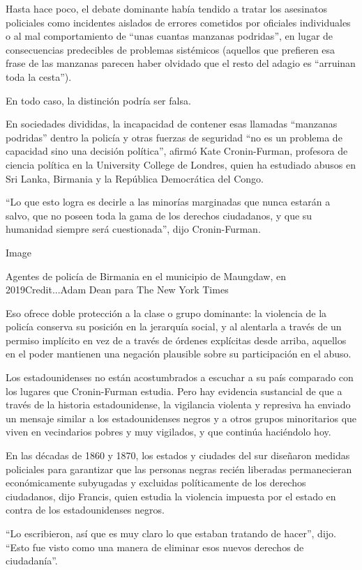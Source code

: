 Hasta hace poco, el debate dominante había tendido a tratar los
asesinatos policiales como incidentes aislados de errores cometidos por
oficiales individuales o al mal comportamiento de ``unas cuantas
manzanas podridas'', en lugar de consecuencias predecibles de problemas
sistémicos (aquellos que prefieren esa frase de las manzanas parecen
haber olvidado que el resto del adagio es ``arruinan toda la cesta'').

En todo caso, la distinción podría ser falsa.

En sociedades divididas, la incapacidad de contener esas llamadas
``manzanas podridas'' dentro la policía y otras fuerzas de seguridad
``no es un problema de capacidad sino una decisión política'', afirmó
Kate Cronin-Furman, profesora de ciencia política en la University
College de Londres, quien ha estudiado abusos en Sri Lanka, Birmania y
la República Democrática del Congo.

``Lo que esto logra es decirle a las minorías marginadas que nunca
estarán a salvo, que no poseen toda la gama de los derechos ciudadanos,
y que su humanidad siempre será cuestionada'', dijo Cronin-Furman.

Image

Agentes de policía de Birmania en el municipio de Maungdaw, en
2019Credit...Adam Dean para The New York Times

Eso ofrece doble protección a la clase o grupo dominante: la violencia
de la policía conserva su posición en la jerarquía social, y al
alentarla a través de un permiso implícito en vez de a través de órdenes
explícitas desde arriba, aquellos en el poder mantienen una negación
plausible sobre su participación en el abuso.

Los estadounidenses no están acostumbrados a escuchar a su país
comparado con los lugares que Cronin-Furman estudia. Pero hay evidencia
sustancial de que a través de la historia estadounidense, la vigilancia
violenta y represiva ha enviado un mensaje similar a los estadounidenses
negros y a otros grupos minoritarios que viven en vecindarios pobres y
muy vigilados, y que continúa haciéndolo hoy.

En las décadas de 1860 y 1870, los estados y ciudades del sur diseñaron
medidas policiales para garantizar que las personas negras recién
liberadas permanecieran económicamente subyugadas y excluidas
políticamente de los derechos ciudadanos, dijo Francis, quien estudia la
violencia impuesta por el estado en contra de los estadounidenses
negros.

``Lo escribieron, así que es muy claro lo que estaban tratando de
hacer'', dijo. ``Esto fue visto como una manera de eliminar esos nuevos
derechos de ciudadanía''.

